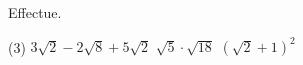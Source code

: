 %
%
    Effectue.
    \begin{tasks}(3)
        \task \(3\sqrt{2} - 2\sqrt{8} + 5\sqrt{2}\)
        \task \(\sqrt{5}\cdot\sqrt{18}\)
        \task \(\left(\sqrt{2}+1\right)^2\)
    \end{tasks}
